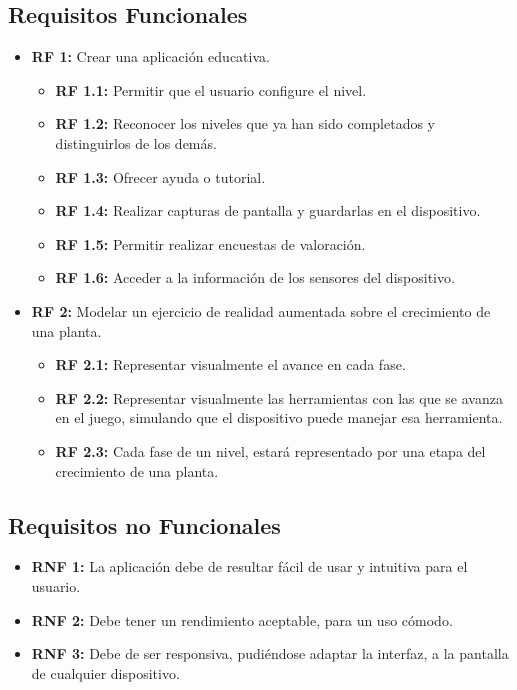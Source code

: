 \subsection{Requisitos Funcionales}
 \begin{itemize}
	\item \textbf{RF 1:} Crear una aplicación educativa.
	\begin{itemize}
	\item \textbf{RF 1.1:} Permitir que el usuario configure el nivel.
	\item \textbf{RF 1.2:} Reconocer los niveles que ya han sido completados y distinguirlos de los demás.
	\item \textbf{RF 1.3:} Ofrecer ayuda o tutorial.	
	\item \textbf{RF 1.4:} Realizar capturas de pantalla y guardarlas en el dispositivo.
	\item \textbf{RF 1.5:} Permitir realizar encuestas de valoración.
	\item \textbf{RF 1.6:} Acceder a la información de los sensores del dispositivo.
	
	\end{itemize} 
	\item \textbf{RF 2:} Modelar un ejercicio de realidad aumentada sobre el crecimiento de una planta.
	\begin{itemize}
	\item \textbf{RF 2.1:} Representar visualmente el avance en cada fase.
	\item \textbf{RF 2.2:} Representar visualmente las herramientas con las que se avanza en el juego, simulando que el dispositivo puede manejar esa herramienta.
	\item \textbf{RF 2.3:} Cada fase de un nivel, estará representado por una etapa del crecimiento de una planta.
	
	\end{itemize} 
	
	
\end{itemize}
\subsection{Requisitos no Funcionales}
\begin{itemize}
	\item \textbf{RNF 1:} La aplicación debe de resultar fácil de usar y intuitiva para el usuario.
	\item \textbf{RNF 2:} Debe tener un rendimiento aceptable, para un uso cómodo.
	\item \textbf{RNF 3:} Debe de ser responsiva, pudiéndose adaptar la interfaz, a la pantalla de cualquier dispositivo.
\end{itemize}
